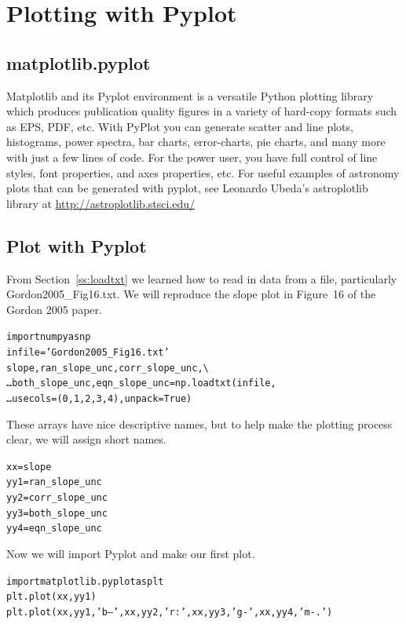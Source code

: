 \chapter{Plotting with Pyplot}
\label{ch:pyplot}

\section{matplotlib.pyplot}
Matplotlib and its Pyplot environment is a versatile Python plotting
library which produces publication quality figures in a variety of
hard-copy formats such as EPS, PDF, etc.  With PyPlot you can
generate scatter and line plots, histograms, power spectra, bar
charts, error-charts, pie charts, and many more with just a few lines
of code. For the power user, you have full control of line styles,
font properties, and axes properties, etc. For useful examples of 
astronomy plots that can be generated with pyplot, see Leonardo 
Ubeda's astroplotlib library at \href{http://astroplotlib.stsci.edu/}
{http://astroplotlib.stsci.edu/}



\section{Plot with Pyplot}
From Section~\ref{ss:loadtxt} we learned how to read in data from a
file, particularly Gordon2005\_Fig16.txt.  We will reproduce the slope
plot in Figure~16 of the Gordon 2005 paper.

\begin{alltt}
\pytab import numpy as np 
\pytab infile = 'Gordon2005_Fig16.txt' 
\pytab slope, ran_slope_unc, corr_slope_unc, \textbackslash 
\ldots     both_slope_unc, eqn_slope_unc = np.loadtxt(infile, 
\ldots    usecols=(0, 1, 2, 3, 4), unpack=True) 
\end{alltt}

These arrays have nice descriptive names, but to help make the
plotting process clear, we will assign short names.

\begin{alltt}
\pytab xx = slope  
\pytab yy1 = ran_slope_unc  
\pytab yy2 = corr_slope_unc  
\pytab yy3 = both_slope_unc  
\pytab yy4 = eqn_slope_unc 
\end{alltt}

Now we will import Pyplot and make our first plot.

\begin{alltt}
\pytab import matplotlib.pyplot as plt  
\pytab plt.plot(xx,yy1)  
\pytab plt.plot(xx,yy1,'b--',xx,yy2,'r:',xx,yy3,'g-', xx,yy4,'m-.')  
\end{alltt}

